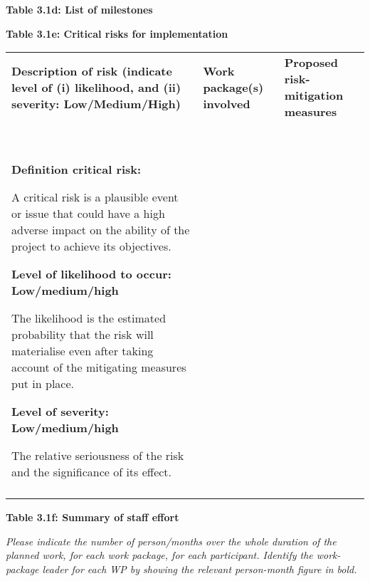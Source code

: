 \textbf{Table 3.1d: List of milestones }

\textbf{Table 3.1e: Critical risks for implementation }

\begin{longtable}[]{@{}
  >{\raggedright\arraybackslash}p{}
  >{\raggedright\arraybackslash}p{}
  >{\raggedright\arraybackslash}p{}@{}}
\toprule
\endhead
\textbf{Description of risk (indicate level of (i) likelihood, and (ii)
severity: Low/Medium/High)} & \textbf{Work package(s) involved} &
\textbf{Proposed risk-mitigation measures} \\
& & \\
& & \\
& & \\
& & \\
& & \\
& & \\
\textbf{Definition critical risk: }

A critical risk is a plausible event or issue that could have a high
adverse impact on the ability of the project to achieve its objectives.

\textbf{Level of likelihood to occur: Low/medium/high}

The likelihood is the estimated probability that the risk will
materialise even after taking account of the mitigating measures put in
place.

\textbf{Level of severity: Low/medium/high}

The relative seriousness of the risk and the significance of its effect.
& & \\
& & \\
\bottomrule
\end{longtable}

\textbf{Table 3.1f: Summary of staff effort}

\emph{Please indicate the number of person/months over the whole
duration of the planned work, for each work package, for each
participant. Identify the work-package leader for each WP by showing the
relevant person-month figure in bold.}

